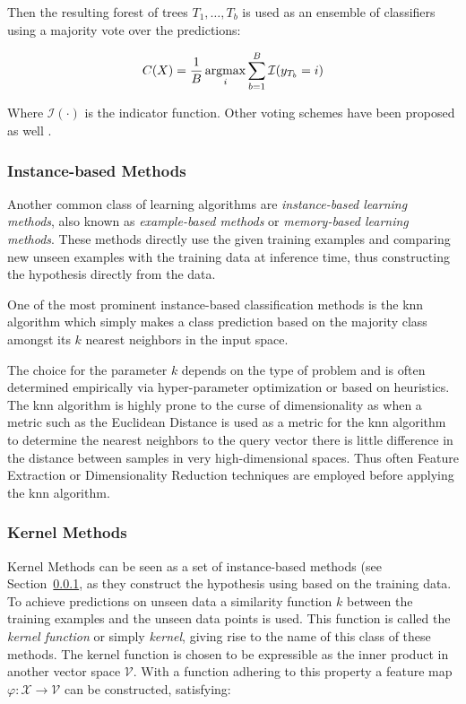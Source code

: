 Then the resulting forest of trees ${T_1, \ldots, T_b}$ is used as an ensemble of classifiers using a majority vote over the predictions:

\begin{equation}
  C(X) = \frac{1}{B} \argmax_i \sum_{b = 1}^B \mathcal{I}(y_{T_b} = i)
\end{equation}

Where $\mathcal{I}(\cdot)$ is the indicator function. Other voting schemes have been proposed as well .

\subsubsection{Instance-based Methods}
\label{subs:Instance-based Methods}

Another common class of learning algorithms are \emph{instance-based learning methods}, also known as \emph{example-based methods} or \emph{memory-based learning methods}. These methods directly use the given training examples and comparing new unseen examples with the training data at inference time, thus constructing the hypothesis directly from the data.

One of the most prominent instance-based classification methods is the \gls{knn} algorithm which simply makes a class prediction based on the majority class amongst its $k$ nearest neighbors in the input space.

The choice for the parameter $k$ depends on the type of problem and is often determined empirically via hyper-parameter optimization or based on heuristics. The \gls{knn} algorithm is highly prone to the curse of dimensionality as when a metric such as the Euclidean Distance is used as a metric for the \gls{knn} algorithm to determine the nearest neighbors to the query vector there is little difference in the distance between samples in very high-dimensional spaces. Thus often \gls{Feature Extraction} or \gls{Dimensionality Reduction} techniques are employed before applying the \gls{knn} algorithm.

\subsubsection{Kernel Methods}
\label{subs:Kernel Methods}


Kernel Methods can be seen as a set of instance-based methods (see Section~\ref{subs:Instance-based Methods}, as they construct the hypothesis using based on the training data. To achieve predictions on unseen data a similarity function $k$ between the training examples and the unseen data points is used. This function is called the \emph{kernel function} or simply \emph{kernel}, giving rise to the name of this class of these methods. The kernel function is chosen to be expressible as the inner product in another vector space $\mathcal{V}$. With a function adhering to this property a feature map $\varphi \colon {\mathcal {X}}\to {\mathcal {V}}$ can be constructed, satisfying:

